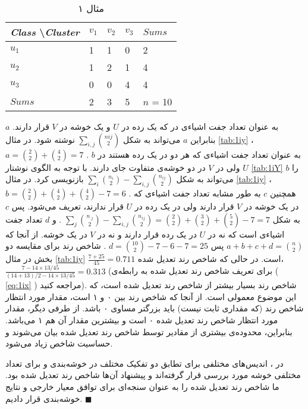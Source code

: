 \begin{table}[h]
\caption{
مثال ۱
}
\centering
\bigskip
\begin{latin}
\begin{tabular}{l|lll|l}
\textit{Class} \textbackslash \textit{Cluster} & $v_1$    & $v_2$  & $v_3$  & $\mathit{Sums}$  	\\ \hline
$u_1$                        & 1 	& 1	 & 0	  & 2 		\\
$u_2$                        & 1 	& 2	 & 1	  & 4		\\
$u_3$                        & 0	& 0	 & 4	  & 4		\\ \hline
$\mathit{Sums}$                         & 2	& 3	 & 5	  & $n$ = 10
\end{tabular}
\end{latin}
\label{tab:1iy}
\end{table}

$a$
به عنوان تعداد جفت اشیاء‌ی در که یک رده در 
$U$
و یک خوشه در 
$V$
قرار دارند. بنابراین 
$a$
می‌تواند به شکل 
$\sum_{i,j} \binom{n{ij}}{2}$
نوشته شود. در مثال 
\autoref{tab:1iy}
،
$a = \binom{2}{2} + \binom{4}{2} = 7$
. 
$b$
به عنوان تعداد جفت اشیاءی که هر دو در یک رده هستند در 
$U$
ولی در 
$V$
در دو خوشه‌ی متفاوت جای دارند. 
با توجه به الگوی نوشتار 
\autoref{tab:1iY}
$b$ 
را می‌تواند به شکل 
$\sum_i \binom{n_i}{2} - \sum_{i,j} \binom{n_{ij}}{2}$
بازنویسی کرد. در مثال 
\autoref{tab:1iy}
،
$b = \binom{2}{2} + \binom{4}{2} + \binom{4}{2} - 7 = 6$
. همچنین
 $c$
به طور مشابه تعداد جفت اشیاءی که در یک خوشه در 
$V$
قرار دارند ولی در یک رده در 
$U$
قرار ندارند، تعریف می‌شود. پس 
$c$
به شکل 
$\sum_j \binom{n_{.j}}{2} - \sum_{i,j} \binom{n_{ij}}{2} = \binom{2}{2} + \binom{3}{2} + \binom{5}{2} - 7 = 7$
. و 
$d$
تعداد جفت اشیاءی است که نه در 
‌$U$
در یک رده قرار دارند و نه در 
$V$
در یک خوشه. از آنجا که 
$a+b+c+d = \binom{n}{2}$
پس
$d = \binom{10}{2} -7 -6 -7 = 25$
. شاخص رند برای مقایسه دو بخش در مثال 
\autoref{tab:1iy}
$ \frac{7+25}{45} = 0.711 $
است. در حالی که شاخص رند تعدیل شده،
$ \frac{7 - 14 \times 13 / 45}{(14+13)/2 - 14 \times 13 / 45} = 0.313$
(برای تعریف شاخص رند تعدیل شده به رابطه‌ی (%
\ref{eq:1ix}%
) مراجعه کنید). شاخص رند بسیار بیشتر از شاخص رند تعدیل شده است، که این موضوع معمولی است. از آنجا که شاخص رند بین ۰ و ۱ است، مقدار مورد انتظار شاخص رند (که مقداری ثابت نیست) باید بزرگتر مساوی ۰ باشد. از طرفی دیگر، مقدار مورد انتظار شاخص رند تعدیل شده ۰ است و بیشترین مقدار آن هم ۱ می‌باشد. بنابراین، محدوده‌ی بیشتری از مقادیر توسط  شاخص رند تعدیل شده بیان می‌شوند و حساسیت شاخص زیاد می‌شود.

در 
\cite{ari1986}
، اندیس‌های مختلفی برای تطابق دو تفکیک مختلف در خوشه‌بندی و برای تعداد مختلفی خوشه مورد بررسی قرار گرفته‌اند و پیشنهاد آن‌ها شاخص رند تعدیل شده بود. ما شاخص رند تعدیل شده را به عنوان سنجه‌ای برای توافق معیار خارجی و نتایج خوشه‌بندی قرار دادیم.
\cite{yeung2001details}
$\blacksquare$
\bigskip

